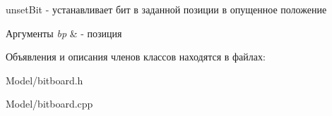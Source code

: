 unset\+Bit -\/ устанавливает бит в заданной позиции в опущенное положение 


\begin{DoxyParams}{Аргументы}
{\em bp} & -\/ позиция \\
\hline
\end{DoxyParams}


Объявления и описания членов классов находятся в файлах\+:\begin{DoxyCompactItemize}
\item 
Model/bitboard.\+h\item 
Model/bitboard.\+cpp\end{DoxyCompactItemize}
